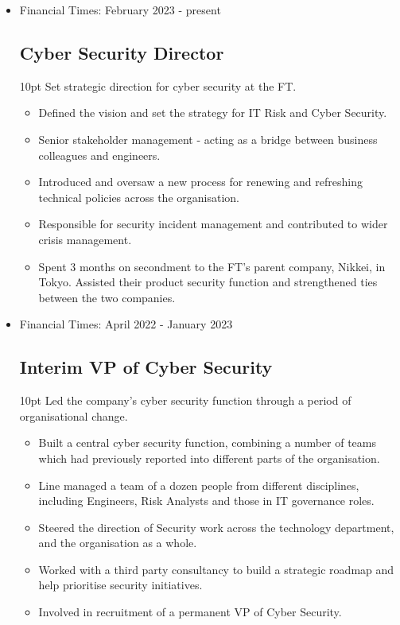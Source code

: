 \documentclass[a4paper]{article}
\newenvironment{detail}{\begin{adjustwidth}{10pt}{}}{\end{adjustwidth}}
\begin{document}
\begin{itemize}


\item Financial Times: February 2023 - present
\subsection*{Cyber Security Director}
\begin{detail}
Set strategic direction for cyber security at the FT.

\begin{itemize}
	\item Defined the vision and set the strategy for IT Risk and Cyber Security.
	\item Senior stakeholder management - acting as a bridge between business colleagues and engineers.
	\item Introduced and oversaw a new process for renewing and refreshing technical policies across the organisation.
	\item Responsible for security incident management and contributed to wider crisis management.
	\item Spent 3 months on secondment to the FT's parent company, Nikkei, in Tokyo.  Assisted their product security function and strengthened ties between the two companies.
\end{itemize}
\end{detail}

\item Financial Times: April 2022 - January 2023
\subsection*{Interim VP of Cyber Security}
\begin{detail}
Led the company's cyber security function through a period of organisational change.

\begin{itemize}
	\item Built a central cyber security function, combining a number of teams which had previously reported into different parts of the organisation.
	\item Line managed a team of a dozen people from different disciplines, including Engineers, Risk Analysts and those in IT governance roles.
	\item Steered the direction of Security work across the technology department, and the organisation as a whole.
	\item Worked with a third party consultancy to build a strategic roadmap and help prioritise security initiatives.
	\item Involved in recruitment of a permanent VP of Cyber Security.
\end{itemize}
\end{detail}


\end{itemize}
\end{document}
